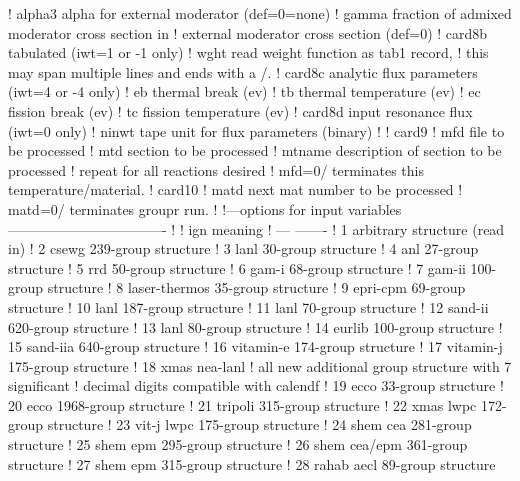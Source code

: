 \begin{ccode}
   !    alpha3   alpha for external moderator (def=0=none)
   !    gamma    fraction of admixed moderator cross section in
   !              external moderator cross section (def=0)
   ! card8b     tabulated (iwt=1 or -1 only)
   !    wght    read weight function as tab1 record,
   !            this may span multiple lines and ends with a /.
   ! card8c     analytic flux parameters (iwt=4 or -4 only)
   !    eb      thermal break (ev)
   !    tb      thermal temperature (ev)
   !    ec      fission break (ev)
   !    tc      fission temperature (ev)
   ! card8d     input resonance flux (iwt=0 only)
   !    ninwt   tape unit for flux parameters (binary)
   !
   ! card9
   !    mfd     file to be processed
   !    mtd     section to be processed
   !    mtname  description of section to be processed
   !          repeat for all reactions desired
   !          mfd=0/ terminates this temperature/material.
   ! card10
   !    matd    next mat number to be processed
   !            matd=0/ terminates groupr run.
   !
   !---options for input variables----------------------------------
   !
   !     ign          meaning
   !     ---          -------
   !      1           arbitrary structure (read in)
   !      2           csewg 239-group structure
   !      3           lanl 30-group structure
   !      4           anl 27-group structure
   !      5           rrd 50-group structure
   !      6           gam-i 68-group structure
   !      7           gam-ii 100-group structure
   !      8           laser-thermos 35-group structure
   !      9           epri-cpm 69-group structure
   !     10           lanl 187-group structure
   !     11           lanl 70-group structure
   !     12           sand-ii 620-group structure
   !     13           lanl 80-group structure
   !     14           eurlib 100-group structure
   !     15           sand-iia 640-group structure
   !     16           vitamin-e 174-group structure
   !     17           vitamin-j 175-group structure
   !     18           xmas nea-lanl
   !     all new additional group structure with 7 significant
   !     decimal digits compatible with calendf
   !     19           ecco  33-group structure
   !     20           ecco 1968-group structure
   !     21           tripoli 315-group structure
   !     22           xmas lwpc 172-group structure
   !     23           vit-j lwpc 175-group structure
   !     24           shem cea 281-group structure
   !     25           shem epm 295-group structure
   !     26           shem cea/epm 361-group structure
   !     27           shem epm 315-group structure
   !     28           rahab aecl 89-group structure

\end{ccode}
